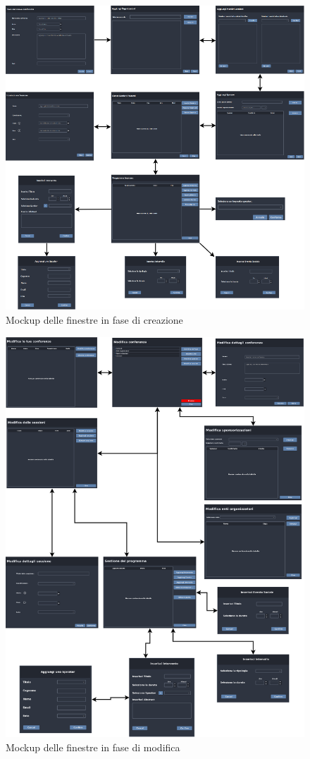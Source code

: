 
\begin{figure}
	\centering
	\includegraphics[scale=0.5]{Immagini/Mockup/Create/Flow_Create.png}
	\caption{Mockup delle finestre in fase di creazione}
\end{figure}

\begin{figure}
	\centering
	\includegraphics[scale=0.5]{Immagini/Mockup/Edit/Flow_Edit.png}
	\caption{Mockup delle finestre in fase di modifica}
\end{figure}

